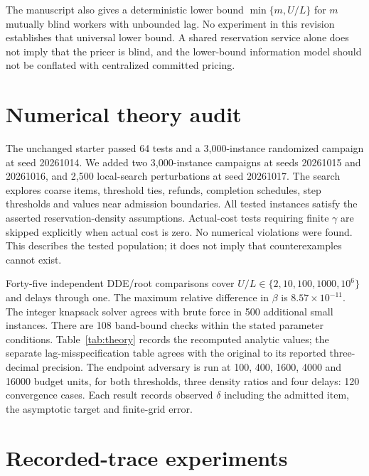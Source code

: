 \documentclass[11pt]{article}
\begin{document}
The manuscript also gives a deterministic lower bound $\min\{m,U/L\}$ for $m$ mutually blind workers with unbounded lag. No experiment in this revision establishes that universal lower bound. A shared reservation service alone does not imply that the pricer is blind, and the lower-bound information model should not be conflated with centralized committed pricing.

\section{Numerical theory audit}
The unchanged starter passed 64 tests and a 3,000-instance randomized campaign at seed 20261014. We added two 3,000-instance campaigns at seeds 20261015 and 20261016, and 2,500 local-search perturbations at seed 20261017. The search explores coarse items, threshold ties, refunds, completion schedules, step thresholds and values near admission boundaries. All tested instances satisfy the asserted reservation-density assumptions. Actual-cost tests requiring finite $\gamma$ are skipped explicitly when actual cost is zero. No numerical violations were found. This describes the tested population; it does not imply that counterexamples cannot exist.

Forty-five independent DDE/root comparisons cover $U/L\in\{2,10,100,1000,10^6\}$ and delays through one. The maximum relative difference in $\beta$ is $8.57\times10^{-11}$. The integer knapsack solver agrees with brute force in 500 additional small instances. There are 108 band-bound checks within the stated parameter conditions. Table~\ref{tab:theory} records the recomputed analytic values; the separate lag-misspecification table agrees with the original to its reported three-decimal precision.
The endpoint adversary is run at 100, 400, 1600, 4000 and 16000 budget units, for both thresholds, three density ratios and four delays: 120 convergence cases. Each result records observed $\delta$ including the admitted item, the asymptotic target and finite-grid error. %

\section{Recorded-trace experiments}\label{sec:methods}
\end{document}
